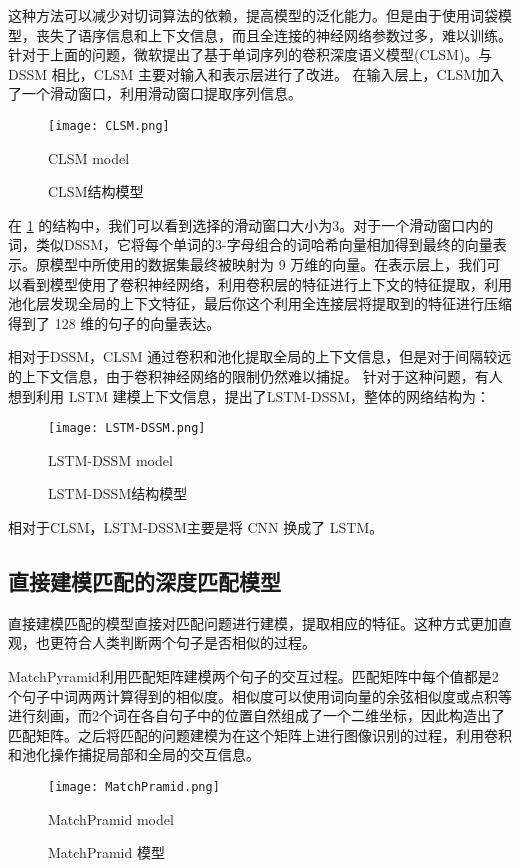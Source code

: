 这种方法可以减少对切词算法的依赖，提高模型的泛化能力。但是由于使用词袋模型，丧失了语序信息和上下文信息，而且全连接的神经网络参数过多，难以训练。
针对于上面的问题，微软提出了基于单词序列的卷积深度语义模型(CLSM)\cite{Shen2014ALS}。与 DSSM 相比，CLSM 主要对输入和表示层进行了改进。
在输入层上，CLSM加入了一个滑动窗口，利用滑动窗口提取序列信息。

\begin{figure}[!htbp]\centering
  \texttt{[image: CLSM.png]}
  \caption{CLSM结构模型}{CLSM model}
  \label{fig:CLSM}       %
\end{figure}

在 \ref{fig:CLSM} 的结构中，我们可以看到选择的滑动窗口大小为3。对于一个滑动窗口内的词，类似DSSM，它将每个单词的3-字母组合的词哈希向量相加得到最终的向量表示。原模型中所使用的数据集最终被映射为 9 万维的向量。在表示层上，我们可以看到模型使用了卷积神经网络，利用卷积层的特征进行上下文的特征提取，利用池化层发现全局的上下文特征，最后你这个利用全连接层将提取到的特征进行压缩得到了 128 维的句子的向量表达。

相对于DSSM，CLSM 通过卷积和池化提取全局的上下文信息，但是对于间隔较远的上下文信息，由于卷积神经网络的限制仍然难以捕捉。
针对于这种问题，有人想到利用 LSTM 建模上下文信息，提出了LSTM-DSSM\cite{Palangi2014SemanticMW}，整体的网络结构为：

\begin{figure}[!htbp]\centering
  \texttt{[image: LSTM-DSSM.png]}
  \caption{LSTM-DSSM结构模型}{LSTM-DSSM model}
  \label{fig:LSTM-DSSM}       %
\end{figure}

相对于CLSM，LSTM-DSSM主要是将 CNN 换成了 LSTM。

\subsection{直接建模匹配的深度匹配模型}
直接建模匹配的模型直接对匹配问题进行建模，提取相应的特征。这种方式更加直观，也更符合人类判断两个句子是否相似的过程。

MatchPyramid\cite{Pang2016TextMA}利用匹配矩阵建模两个句子的交互过程。匹配矩阵中每个值都是2个句子中词两两计算得到的相似度。相似度可以使用词向量的余弦相似度或点积等进行刻画，而2个词在各自句子中的位置自然组成了一个二维坐标，因此构造出了匹配矩阵。之后将匹配的问题建模为在这个矩阵上进行图像识别的过程，利用卷积和池化操作捕捉局部和全局的交互信息。

\begin{figure}[!htbp]\centering
  \texttt{[image: MatchPramid.png]}
  \caption{MatchPramid 模型}{MatchPramid model}
  \label{fig:MatchPramid}       %
\end{figure}

